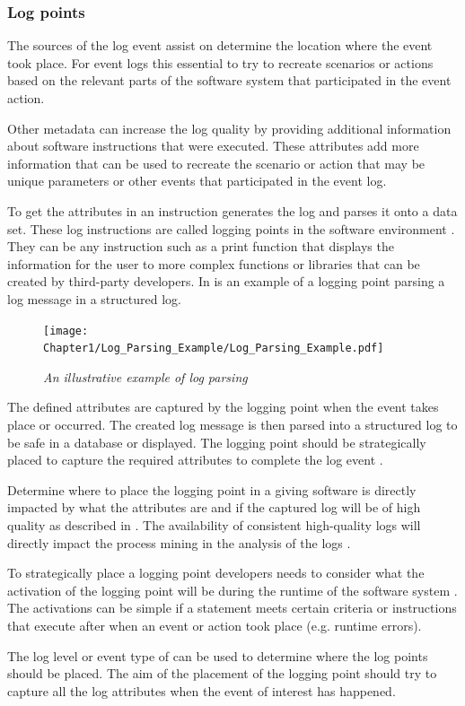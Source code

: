 \subsubsection{Log points}

The sources of the log event assist on determine the location where the event took place. For event logs this essential to try to recreate scenarios or actions based on the relevant parts of the software system that participated in the event action.\par Other metadata can increase the log quality by providing additional information about software instructions that were executed. These attributes add more information that can be used to recreate the scenario or action that may be unique parameters or other events that participated in the event log.\par To get the attributes in  an instruction generates the log and parses it onto a data set. These log instructions are called logging points in the software environment \cite{Pecchia2015, Zhu2015}. They can be any instruction such as a print function that displays the information for the user to more complex functions or libraries that can be created by third-party developers. In  is an example of a logging point parsing a log message in a structured log. 

\begin{figure}[!htb]
	\centering %
	\texttt{[image: Chapter1/Log\_Parsing\_Example/Log\_Parsing\_Example.pdf]}
	\caption[An illustrative example of log parsing]
	{\textit{An illustrative example of log parsing \cite{Zhu2019}}} \label{fig:ch1_logParsing}
\end{figure}

The defined attributes are captured by the logging point when the event takes place or occurred. The created log message is then parsed into a structured log to be safe in a database or displayed. The logging point should be strategically placed to capture the required attributes to complete the log event \cite{Fedaghi2010}.\par Determine where to place the logging point in a giving software is directly impacted by what the attributes are and if the captured log will be of high quality as described in . The availability of consistent high-quality logs will directly impact the process mining in the analysis of the logs \cite{Kherbouche2017}.\par To strategically place a logging point developers needs to consider what the activation of the logging point will be during the runtime of the software system \cite{Pecchia2015, Cinque2013}. The activations can be simple if a statement meets certain criteria or instructions that execute after when an event or action took place (e.g. runtime errors). \par The log level or event type of  can be used to determine where the log points should be placed. The aim of the placement of the logging point should try to capture all the log attributes when the event of interest has happened.

